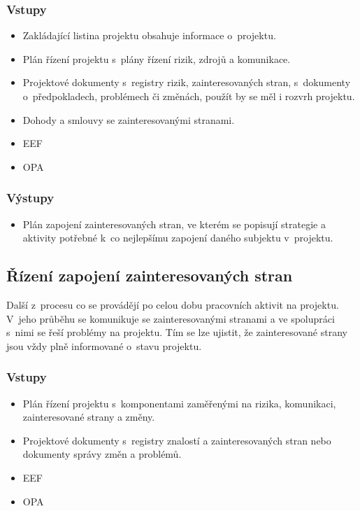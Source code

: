 \subsubsection*{Vstupy}
\begin{itemize}
    \item Zakládající listina projektu obsahuje informace o~projektu.
    \item Plán řízení projektu s~plány řízení rizik, zdrojů a komunikace. 
    \item Projektové dokumenty s~registry rizik, zainteresovaných stran, s~dokumenty o~předpokladech, problémech či změnách, použít by se měl i rozvrh projektu.
    \item Dohody a smlouvy se zainteresovanými stranami.
    \item EEF
    \item OPA
\end{itemize}
\subsubsection*{Výstupy}
\begin{itemize}
    \item Plán zapojení zainteresovaných stran, ve kterém se popisují strategie a aktivity potřebné k~co nejlepšímu zapojení daného subjektu v~projektu.
\end{itemize}



\subsection*{Řízení zapojení zainteresovaných stran}

Další z~procesu co se provádějí po celou dobu pracovních aktivit na projektu. V~jeho průběhu se komunikuje se zainteresovanými stranami a ve spolupráci s~nimi se řeší problémy na projektu. Tím se lze ujistit, že zainteresované strany jsou vždy plně informované o~stavu projektu.

\subsubsection*{Vstupy}
\begin{itemize}
    \item Plán řízení projektu s~komponentami zaměřenými na rizika, komunikaci, zainteresované strany a změny.
    \item Projektové dokumenty s~registry znalostí a zainteresovaných stran nebo dokumenty správy změn a problémů.
    \item EEF
    \item OPA
\end{itemize}
